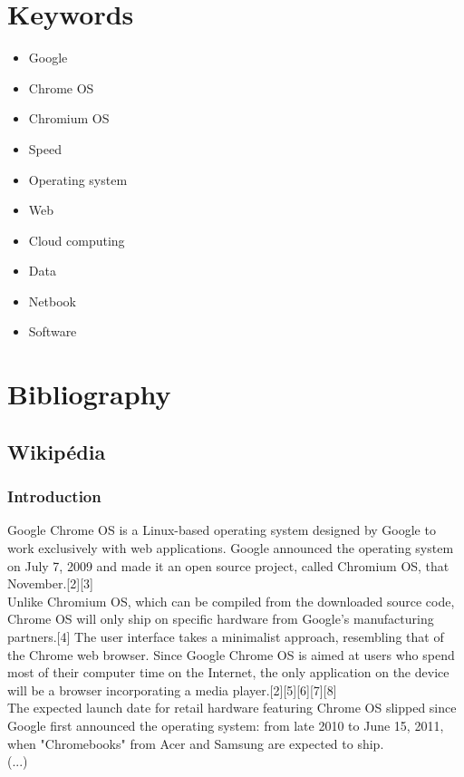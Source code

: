 \documentclass{article}
\begin{document}
	\section{Keywords}
	\begin{multicols}{3}
		\begin{itemize}
			\item Google
			\item Chrome OS
			\item Chromium OS
			\item Speed
			\item Operating system
			\item Web
			\item Cloud computing
			\item Data
			\item Netbook
			\item Software
		\end{itemize}
	\end{multicols}
	\newpage
	\section{Bibliography}	
		\subsection{Wikipédia}
			\subsubsection{Introduction}
			Google Chrome OS is a Linux-based operating system designed by Google to work exclusively with web applications. Google announced the operating system on July 7, 2009 and made it an open source project, called Chromium OS, that November.[2][3]\\
			Unlike Chromium OS, which can be compiled from the downloaded source code, Chrome OS will only ship on specific hardware from Google's manufacturing partners.[4] The user interface takes a minimalist approach, resembling that of the Chrome web browser. Since Google Chrome OS is aimed at users who spend most of their computer time on the Internet, the only application on the device will be a browser incorporating a media player.[2][5][6][7][8]\\
			The expected launch date for retail hardware featuring Chrome OS slipped since Google first announced the operating system: from late 2010 to June 15, 2011, when "Chromebooks" from Acer and Samsung are expected to ship.\\
			(...)	
\end{document}

